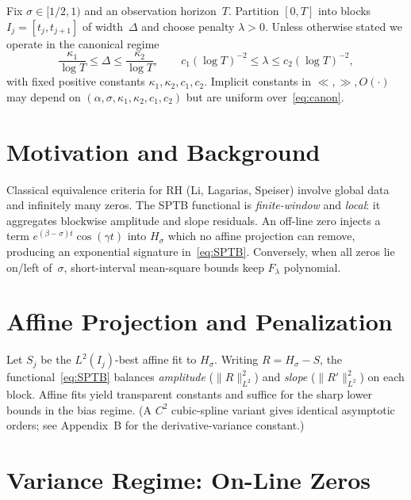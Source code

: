 Fix $\sigma\in[1/2,1)$ and an observation horizon~$T$.
Partition $[0,T]$ into blocks $I_j=[t_j,t_{j+1}]$ of width~$\Delta$ and choose
penalty $\lambda>0$.  Unless otherwise stated we operate in the canonical regime
\begin{equation}
\frac{\kappa_1}{\log T}\le\Delta\le\frac{\kappa_2}{\log T},
\qquad
c_1(\log T)^{-2}\le\lambda\le c_2(\log T)^{-2},
\label{eq:canon}
\tag{1.2}
\end{equation}
with fixed positive constants $\kappa_1,\kappa_2,c_1,c_2$.
Implicit constants in $\ll,\gg,O(\cdot)$ may depend on
$(\alpha,\sigma,\kappa_1,\kappa_2,c_1,c_2)$ but are uniform over~\eqref{eq:canon}.

\section{Motivation and Background}

Classical equivalence criteria for RH (Li, Lagarias, Speiser) involve global data
and infinitely many zeros.  The SPTB functional is
\emph{finite-window} and \emph{local}: it aggregates blockwise amplitude and slope
residuals.  An off-line zero injects a term
$e^{(\beta-\sigma)t}\cos(\gamma t)$ into $H_\sigma$ which no affine projection can remove,
producing an exponential signature in~\eqref{eq:SPTB}.
Conversely, when all zeros lie on/left of~$\sigma$, short-interval
mean-square bounds keep $F_\lambda$ polynomial.

\section{Affine Projection and Penalization}

Let $S_j$ be the $L^2(I_j)$-best affine fit to $H_\sigma$.
Writing $R = H_\sigma - S$, the functional~\eqref{eq:SPTB}
balances \emph{amplitude} ($\|R\|_{L^2}^2$) and \emph{slope} ($\|R'\|_{L^2}^2$)
on each block.  Affine fits yield transparent constants and suffice
for the sharp lower bounds in the bias regime.
(A $C^2$ cubic-spline variant gives identical asymptotic orders; see
Appendix~B for the derivative-variance constant.)

\section{Variance Regime: On-Line Zeros}


